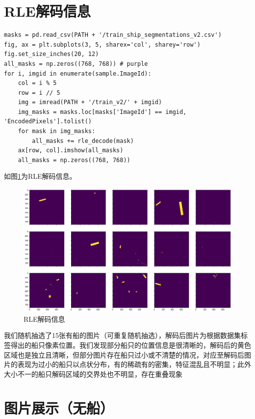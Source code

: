 \section{RLE解码信息}\label{rleux89e3ux7801ux4fe1ux606f}

\begin{lstlisting}
masks = pd.read_csv(PATH + '/train_ship_segmentations_v2.csv')
fig, ax = plt.subplots(3, 5, sharex='col', sharey='row')
fig.set_size_inches(20, 12)
all_masks = np.zeros((768, 768)) # purple
for i, imgid in enumerate(sample.ImageId):
    col = i % 5
    row = i // 5
    img = imread(PATH + '/train_v2/' + imgid)
    img_masks = masks.loc[masks['ImageId'] == imgid, 'EncodedPixels'].tolist()
    for mask in img_masks:
        all_masks += rle_decode(mask)
    ax[row, col].imshow(all_masks)
    all_masks = np.zeros((768, 768))
\end{lstlisting}

如图\ref{fig::EDA6}为RLE解码信息。

\begin{figure}[htbp]
\centering
\includegraphics[width=1\linewidth]{body/EDA_pic/EDA_9_0}
\caption{RLE解码信息}
\label{fig::EDA6}
\end{figure}

我们随机抽选了15张有船的图片（可重复随机抽选），解码后图片为根据数据集标签得出的船只像素位置。我们发现部分船只的位置信息是很清晰的，解码后的黄色区域也是独立且清晰，但部分图片存在船只过小或不清楚的情况，对应至解码后图片的表现为过小的船只以点状分布，有的稀疏有的密集，特征混乱且不明显；此外大小不一的船只解码区域的交界处也不明显，存在重叠现象

\section{图片展示（无船）}\label{ux56feux7247ux5c55ux793aux65e0ux8239}


